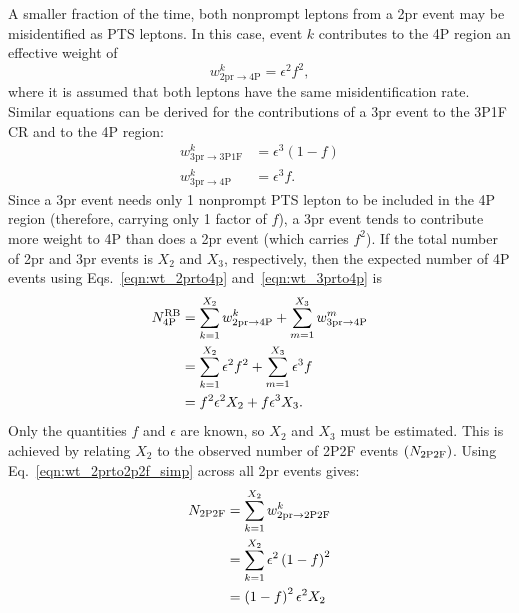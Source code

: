 A smaller fraction of the time, both nonprompt leptons from a 2pr event may be misidentified as PTS leptons.
In this case, event $k$ contributes to the 4P region an effective weight of
\begin{equation}
	\label{eqn:wt_2prto4p}
	w^{k}_{\mathrm{2pr \to 4P}} = \epsilon^2 f^2,
\end{equation}
where it is assumed that both leptons have the same misidentification rate.
Similar equations can be derived for the contributions of a 3pr event to the 3P1F CR and to the 4P region:
\begin{align}
	\label{eqn:wt_3prto3p1f}
	w^{k}_{\mathrm{3pr \to 3P1F}} &= \epsilon^3 \left( 1-f \right)
	\\
	\label{eqn:wt_3prto4p}
	w^{k}_{\mathrm{3pr \to 4P}} &= \epsilon^3 f.
\end{align}
Since a 3pr event needs only 1 nonprompt PTS lepton to be included in the 4P region (therefore, carrying only 1 factor of $f$), a 3pr event tends to contribute more weight to 4P than does a 2pr event (which carries $f^2$).
If the total number of 2pr and 3pr events is $X_2$ and $X_3$, respectively, then the expected number of 4P events using Eqs.~\ref{eqn:wt_2prto4p} and~\ref{eqn:wt_3prto4p} is
\begin{align}
	\label{eqn:n4p_x2x3}
	N_{\mathrm{4P}}^{\mathrm{RB}}
	&= \sum_{k=1}^{X_{2}} w^{k}_{\mathrm{2pr \to 4P}} + \sum_{m=1}^{X_{3}} w^{m}_{\mathrm{3pr \to 4P}}
	\notag
	\\
	&= \sum_{k=1}^{X_{2}} \epsilon^2 f^2 + \sum_{m=1}^{X_{3}} \epsilon^3 f
	\notag
	\\
	&= f^2 \epsilon^2 X_{2} + f \epsilon^3 X_{3}.
\end{align}
Only the quantities $f$ and $\epsilon$ are known, so $X_2$ and $X_3$ must be estimated.
This is achieved by relating $X_2$ to the observed number of 2P2F events $\left( N_{\mathrm{2P2F}} \right)$.
Using Eq.~\ref{eqn:wt_2prto2p2f_simp} across all 2pr events gives:
\begin{align}
	\label{eqn:n2p2f_x2}
	N_{\mathrm{2P2F}}
	&= \sum_{k=1}^{X_{2}} w^{k}_{\mathrm{2pr \to 2P2F}}
	\notag
	\\
	&= \sum_{k=1}^{X_{2}} \epsilon^2 \left( 1-f \right)^2
	\notag
	\\
	&= \left( 1-f \right)^2 \epsilon^2 X_{2}
\end{align}

